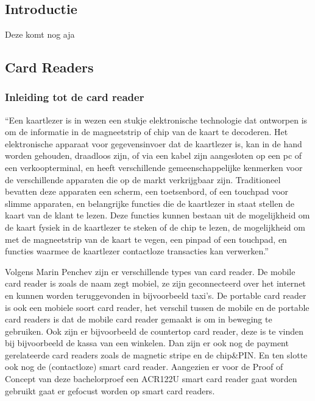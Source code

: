 \chapter{}%
\label{ch:stand-van-zaken}



\section{Introductie}
\label{sec:introductie}

Deze komt nog aja

\section{Card Readers}
\subsection{Inleiding tot de card reader}
``Een kaartlezer is in wezen een stukje elektronische technologie dat ontworpen is om de informatie in de magneetstrip of chip van de kaart te decoderen. Het elektronische apparaat voor gegevensinvoer dat de kaartlezer is, kan in de hand worden gehouden, draadloos zijn, of via een kabel zijn aangesloten op een pc of een verkoopterminal, en heeft verschillende gemeenschappelijke kenmerken voor de verschillende apparaten die op de markt verkrijgbaar zijn.
Traditioneel bevatten deze apparaten een scherm, een toetsenbord, of een touchpad voor slimme apparaten, en belangrijke functies die de kaartlezer in staat stellen de kaart van de klant te lezen. Deze functies kunnen bestaan uit de mogelijkheid om de kaart fysiek in de kaartlezer te steken of de chip te lezen, de mogelijkheid om met de magneetstrip van de kaart te vegen, een pinpad of een touchpad, en functies waarmee de kaartlezer contactloze transacties kan verwerken.''

Volgens Marin Penchev zijn er verschillende types van card reader. De mobile card reader is zoals de naam zegt mobiel, ze zijn geconnecteerd over het internet en kunnen worden teruggevonden in bijvoorbeeld taxi's. De portable card reader is ook een mobiele soort card reader, het verschil tussen de mobile en de portable card readers is dat de mobile card reader gemaakt is om in beweging te gebruiken. Ook zijn er bijvoorbeeld de countertop card reader, deze is te vinden bij bijvoorbeeld de kassa van een winkelen. Dan zijn er ook nog de payment gerelateerde card readers zoals de magnetic stripe en de chip&PIN. En ten slotte ook nog de (contactloze) smart card reader. Aangezien er voor de Proof of Concept van deze bachelorproef een ACR122U smart card reader gaat worden gebruikt gaat er gefocust worden op smart card readers.



